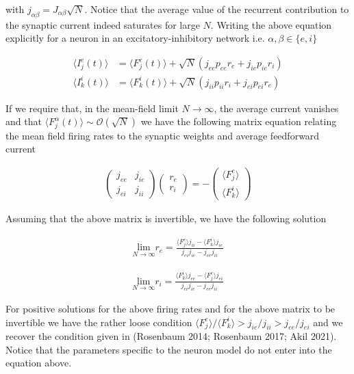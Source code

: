 \documentclass{ucetd}
\begin{document}
with $j_{\alpha\beta} = J_{\alpha\beta}\sqrt{N}$. Notice that the average value of the recurrent contribution to the synaptic current indeed saturates for large $N$. Writing the above equation explicitly for a neuron in an excitatory-inhibitory network i.e. $\alpha, \beta \in \{e, i\}$

\begin{align}
\langle I_{j}^{e}(t)\rangle &= \langle F_{j}^{e}(t)\rangle + \sqrt{N}\left(j_{ee}p_{ee}r_{e} + j_{ie}p_{ie}r_{i}\right)\\
\langle I_{k}^{i}(t)\rangle &= \langle F_{k}^{i}(t)\rangle + \sqrt{N}\left(j_{ii}p_{ii}r_{i} + j_{ei}p_{ei}r_{e}\right)
\end{align}

If we require that, in the mean-field limit $N\rightarrow\infty$, the average current vanishes and that $\langle F_{j}^{\alpha}(t)\rangle \sim \mathcal{O}(\sqrt{N})$ we have the following matrix equation relating the mean field firing rates to the synaptic weights and average feedforward current

\begin{align}
\begin{pmatrix}
j_{ee} & j_{ie}\\
j_{ei} & j_{ii}
\end{pmatrix}
\begin{pmatrix}
r_{e}\\
r_{i}
\end{pmatrix}
= 
-\begin{pmatrix}
\langle F_{j}^{e}\rangle\\
\langle F_{k}^{i}\rangle
\end{pmatrix}
\end{align}

Assuming that the above matrix is invertible, we have the following solution

\begin{align}
\underset{N\rightarrow \infty}{\mathrm{lim}}r_{e} = \frac{\langle F_{j}^{e}\rangle j_{ii}-\langle F_{k}^{i}\rangle j_{ie}}{j_{ei}j_{ie} - j_{ee}j_{ii}}
\end{align}

\begin{align}
\underset{N\rightarrow \infty}{\mathrm{lim}}r_{i} = \frac{\langle F_{k}^{i}\rangle j_{ee}-\langle F_{j}^{e}\rangle j_{ei}}{j_{ei}j_{ie} - j_{ee}j_{ii}}
\end{align}

For positive solutions for the above firing rates and for the above matrix to be invertible we have the rather loose condition $\langle F_{j}^{e}\rangle/\langle F_{k}^{i}\rangle > j_{ie}/j_{ii} > j_{ee}/j_{ei}$ and we recover the condition given in (Rosenbaum 2014; Rosenbaum 2017; Akil 2021). Notice that the parameters specific to the neuron model do not enter into the equation above. 
\end{document}
